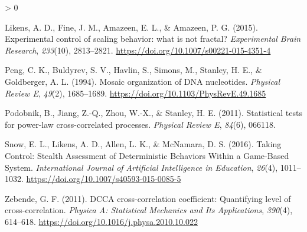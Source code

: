 \documentclass[
  english,
  man]{apa6}
\newlength{\cslhangindent}
\newenvironment{CSLReferences}[2] %
 {%
  \setlength{\parindent}{0pt}
  \ifodd #1 \everypar{\setlength{\hangindent}{\cslhangindent}}\ignorespaces\fi
  \ifnum #2 > 0
  \setlength{\parskip}{#2\baselineskip}
  \fi
 }%
 {}
\begin{document}
\begin{CSLReferences}{1}{0}
\leavevmode\hypertarget{ref-likens2015}{}%
Likens, A. D., Fine, J. M., Amazeen, E. L., \& Amazeen, P. G. (2015). Experimental control of scaling behavior: what is not fractal? \emph{Experimental Brain Research}, \emph{233}(10), 2813--2821. \url{https://doi.org/10.1007/s00221-015-4351-4}

\leavevmode\hypertarget{ref-peng1994}{}%
Peng, C. K., Buldyrev, S. V., Havlin, S., Simons, M., Stanley, H. E., \& Goldberger, A. L. (1994). Mosaic organization of DNA nucleotides. \emph{Physical Review E}, \emph{49}(2), 1685--1689. \url{https://doi.org/10.1103/PhysRevE.49.1685}

\leavevmode\hypertarget{ref-podobnik2011}{}%
Podobnik, B., Jiang, Z.-Q., Zhou, W.-X., \& Stanley, H. E. (2011). Statistical tests for power-law cross-correlated processes. \emph{Physical Review E}, \emph{84}(6), 066118.

\leavevmode\hypertarget{ref-snow2016}{}%
Snow, E. L., Likens, A. D., Allen, L. K., \& McNamara, D. S. (2016). Taking Control: Stealth Assessment of Deterministic Behaviors Within a Game-Based System. \emph{International Journal of Artificial Intelligence in Education}, \emph{26}(4), 1011--1032. \url{https://doi.org/10.1007/s40593-015-0085-5}

\leavevmode\hypertarget{ref-zebende2011}{}%
Zebende, G. F. (2011). DCCA cross-correlation coefficient: Quantifying level of cross-correlation. \emph{Physica A: Statistical Mechanics and Its Applications}, \emph{390}(4), 614--618. \url{https://doi.org/10.1016/j.physa.2010.10.022}

\end{CSLReferences}

\endgroup
\end{document}
